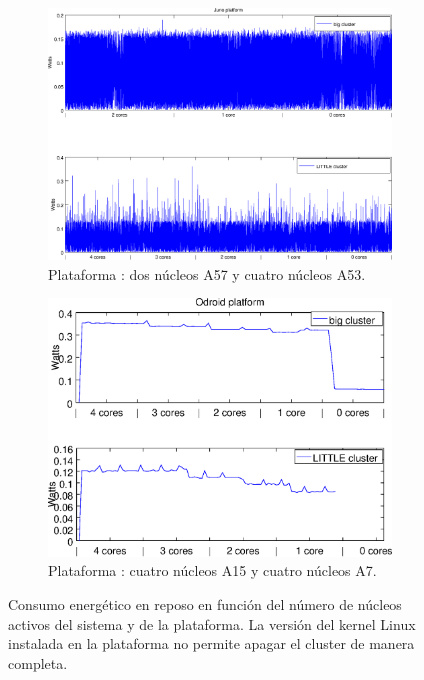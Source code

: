 \begin{figure}
  \centering
  \begin{subfigure}{1.0\textwidth}
    \centering
    \includegraphics[width=0.75\linewidth]{Plots/Modelos_consumo/apagadoJuno.eps}
    \caption{Plataforma \juno: dos núcleos \BIG A57 y cuatro núcleos \LITTLE A53.}
    \end{subfigure}

    \vspace{0.5cm}

    \begin{subfigure}{1.0\textwidth}
      \centering
      \includegraphics[width=0.8\linewidth]{Plots/Modelos_consumo/apagadoOdroid.eps}
      \caption{Plataforma \odroid: cuatro núcleos \BIG A15 y cuatro núcleos \LITTLE A7.}
    \end{subfigure}  
    
  \caption[Consumo energético en función del número de cores activos en
  cada cluster]{Consumo energético en reposo en función del número de núcleos
    activos del sistema y de la plataforma. La versión del kernel Linux
    instalada en la plataforma \odroid no permite apagar el cluster
    \LITTLE de manera completa.}
  \label{s5:fig:apagadoCores}
\end{figure}

